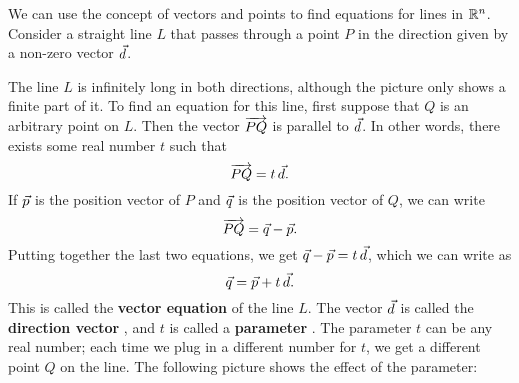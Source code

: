 \documentclass{ximera}
\begin{document}
We can use the concept of vectors and points to find equations for
lines in $\mathbb{R}^n$. Consider a straight line $L$ that passes through a
point $P$ in the direction given by a non-zero vector $\vec{d}$.
\begin{center}
\end{center}
The line $L$ is infinitely long in both directions, although the
picture only shows a finite part of it. To find an equation for this
line, first suppose that $Q$ is an arbitrary point on $L$. Then the
vector $\overrightarrow{PQ}$ is parallel to $\vec{d}$. In other words,
there exists some real number $t$ such that
\begin{equation*}
  \overrightarrow{PQ} = t\,\vec{d}.
\end{equation*}
If $\vec{p}$ is the position vector of $P$ and $\vec{q}$ is the
position vector of $Q$, we can write
\begin{equation*}
  \overrightarrow{PQ} = \vec{q}-\vec{p}.
\end{equation*}
Putting together the last two equations, we get $\vec{q}-\vec{p} =
t\,\vec{d}$, which we can write as
\begin{equation*}
  \vec{q} = \vec{p} + t\,\vec{d}.
\end{equation*}
This is called the \textbf{vector equation}%
%
 of the line $L$. The vector $\vec{d}$ is
called the \textbf{direction vector}%
%
, and $t$ is called a
\textbf{parameter}%
. The parameter $t$ can be any real number; each time
we plug in a different number for $t$, we get a different point $Q$ on
the line. The following picture shows the effect of the parameter:
\end{document}
